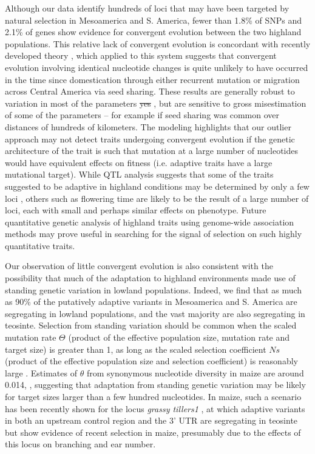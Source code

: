Although our data identify hundreds of loci that may have been targeted by natural selection in Mesoamerica and S. America, 
fewer than 1.8\% of SNPs and 2.1\% of genes show evidence for convergent evolution between the two highland populations.
This relative lack of convergent evolution is concordant with recently developed theory \citep{ralph2014convergent},
which applied to this system suggests that convergent evolution involving identical nucleotide changes 
is quite unlikely to have occurred in the time since domestication through either recurrent mutation or migration across Central America via seed sharing.   
These results are generally robust to variation in most of the parameters  \st{yes} , 
but are sensitive to gross misestimation of some of the parameters -- for example if seed sharing was common over distances of hundreds of kilometers.  
The modeling highlights that our outlier approach may not detect traits undergoing convergent evolution 
if the genetic architecture of the trait is such that mutation at a large number of nucleotides would have equivalent effects on fitness 
(i.e. adaptive traits have a large mutational target). 
While QTL analysis suggests that some of the traits suggested to be adaptive in highland conditions may be determined by only a few loci \citep{Lauter_2004_15342532}, 
others such as flowering time \citep{buckler2009genetic} are likely to be the result of a large number of loci, each with small and perhaps similar effects on phenotype.  
Future quantitative genetic analysis of highland traits using genome-wide association methods may prove useful in searching for the signal of selection on such highly quantitative traits. 

Our observation of little convergent evolution is also consistent with the possibility that much of the adaptation to highland environments made use of standing genetic variation in lowland populations. 
Indeed, we find that as much as 90\% of the putatively adaptive variants in Mesoamerica and S. America are segregating in lowland populations, 
and the vast majority are also segregating in teosinte.  
Selection from standing variation should be common when the scaled mutation rate $\Theta$ 
(product of the effective population size, mutation rate and target size) is greater than 1,
as long as the scaled selection coefficient $Ns$ 
(product of the effective population size and selection coefficient) is reasonably large \cite[]{Hermisson_2005_15716498}.
Estimates of $\theta$ from synonymous nucleotide diversity in maize are around 0.014, \citep{Tenaillon_2004_15014173,Wright_2005_15919994,Ross-Ibarra_2009_19153259}, 
suggesting that adaptation from standing genetic variation may be likely for target sizes larger than a few hundred nucleotides.
In maize, such a scenario has been recently shown for the locus \emph{grassy tillers1} \cite[]{Wills_2013_23825971}, at which adaptive variants in both an upstream control region and the 3' UTR are segregating in teosinte but show evidence of recent selection in maize, presumably due to the effects of this locus on branching and ear number.

